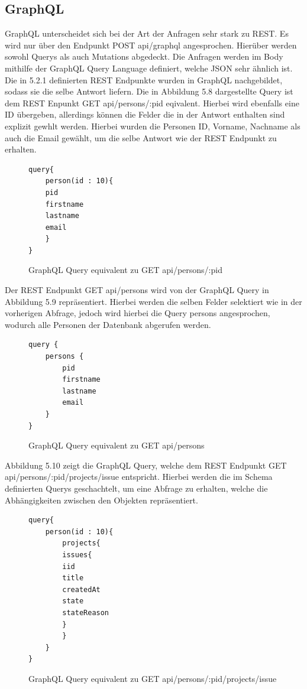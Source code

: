 
\subsection{GraphQL}
GraphQL unterscheidet sich bei der Art der Anfragen sehr stark zu REST. Es wird nur über den Endpunkt POST api/graphql angesprochen. Hierüber werden sowohl Querys als auch Mutations abgedeckt. Die Anfragen werden im Body mithilfe der GraphQL Query Language definiert, welche JSON sehr ähnlich ist. Die in 5.2.1 definierten REST Endpunkte wurden in GraphQL nachgebildet, sodass sie die selbe Antwort liefern. Die in Abbildung 5.8 dargestellte Query ist dem REST Enpunkt GET api/persons/:pid eqivalent. Hierbei wird ebenfalls eine ID übergeben, allerdings können die Felder die in der Antwort enthalten sind explizit gewhlt werden. Hierbei wurden die Personen ID, Vorname, Nachname als auch die Email gewählt, um die selbe Antwort wie der REST Endpunkt zu erhalten. 
\begin{figure}[H]
\begin{center}
\begin{BVerbatim}
query{
    person(id : 10){
	pid
	firstname
	lastname
	email
    }
}
\end{BVerbatim}
\end{center}
\caption{GraphQL Query equivalent zu GET api/persons/:pid}
\end{figure}
\noindent
Der REST Endpunkt GET api/persons wird von der GraphQL Query in Abbildung 5.9 repräsentiert. Hierbei werden die selben Felder selektiert wie in der vorherigen Abfrage, jedoch wird hierbei die Query persons angesprochen, wodurch alle Personen der Datenbank abgerufen werden.
\begin{figure}[H]
\begin{center}
\begin{BVerbatim}
query {
    persons {
        pid
        firstname
        lastname
        email
    }
}
\end{BVerbatim}
\end{center}
\caption{GraphQL Query equivalent zu GET api/persons}
\end{figure}
\noindent
Abbildung 5.10 zeigt die GraphQL Query, welche dem REST Endpunkt GET api/persons/:pid/projects/issue entspricht. Hierbei werden die im Schema definierten Querys geschachtelt, um eine Abfrage zu erhalten, welche die Abhängigkeiten zwischen den Objekten repräsentiert.
\begin{figure}[H]
\begin{center}
\begin{BVerbatim}
query{
    person(id : 10){
        projects{
	    issues{
		iid
		title
		createdAt
		state
		stateReason
	    }
        }
    }
}
\end{BVerbatim}
\end{center}
\caption{GraphQL Query equivalent zu GET api/persons/:pid/projects/issue}
\end{figure}
